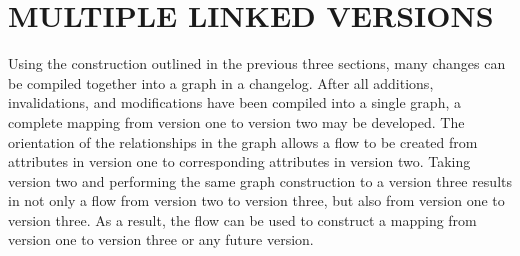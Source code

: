 \section{MULTIPLE LINKED VERSIONS}

Using the construction outlined in the previous three sections, many changes can be compiled together into a graph in a changelog.  After all additions, invalidations, and modifications have been compiled into a single graph, a complete mapping from version one to version two may be developed.  The orientation of the relationships in the graph allows a flow to be created from attributes in version one to corresponding attributes in version two.  Taking version two and performing the same graph construction to a version three results in not only a flow from version two to version three, but also from version one to version three.  As a result, the flow can be used to construct a mapping from version one to version three or any future version.
